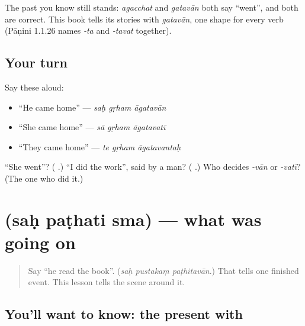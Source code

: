 The past you know still stands: \emph{agacchat} and \emph{gatavān} both say \textquotedblleft{}went\textquotedblright{}, and both are correct. This book tells its stories with \emph{gatavān}, one shape for every verb (Pāṇini 1.1.26 names \emph{-ta} and \emph{-tavat} together).

\subsection*{Your turn}
Say these aloud:

\begin{itemize}
\raggedright
  \item \textquotedblleft{}He came home\textquotedblright{} — \emph{saḥ gṛham āgatavān}
  \item \textquotedblleft{}She came home\textquotedblright{} — \emph{sā gṛham āgatavatī}
  \item \textquotedblleft{}They came home\textquotedblright{} — \emph{te gṛham āgatavantaḥ}
\end{itemize}

\begin{tcolorbox}[breakable,colback=teal!4,colframe=teal!35!black,title={Before you move on}]
\textquotedblleft{}She went\textquotedblright{}? (\textbf{ }.) \textquotedblleft{}I did the work\textquotedblright{}, said by a man? (\textbf{  }.) Who decides \emph{-vān} or \emph{-vatī}? (The one who did it.)
\end{tcolorbox}
\section[\texorpdfstring{\sk{सः} \sk{पठति} \sk{स्म} (saḥ paṭhati sma)}{सः पठति स्म (saḥ paṭhati sma)}]{   (saḥ paṭhati sma) — what was going on}

\label{lesson:SA-C276-sah-pathati-sma}



\begin{quote}
Say \textquotedblleft{}he read the book\textquotedblright{}. (\emph{saḥ pustakaṃ paṭhitavān}.) That tells one finished event. This lesson tells the scene around it.
\end{quote}

\subsection*{You'll want to know: the present with }
\begin{quote}
\textbf{  }
\end{quote}

